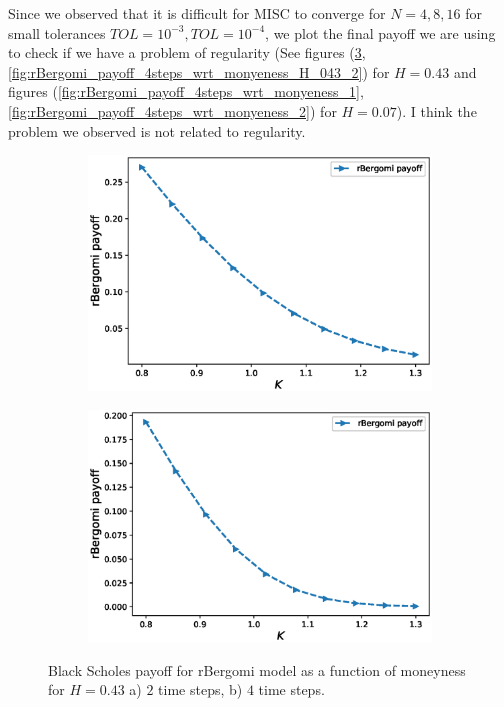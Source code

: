 \documentclass[11pt]{article}
\begin{document}
Since we observed that it is difficult for MISC to converge for $N=4,8,16$ for small tolerances $TOL=10^{-3}, TOL=10^{-4}$, we plot the final payoff we are using to check if we have a problem of regularity (See figures (\ref{fig:rBergomi_payoff_4steps_wrt_monyeness_H_043_1}, \ref{fig:rBergomi_payoff_4steps_wrt_monyeness_H_043_2}) for $H=0.43$ and figures (\ref{fig:rBergomi_payoff_4steps_wrt_monyeness_1}, \ref{fig:rBergomi_payoff_4steps_wrt_monyeness_2}) for $H=0.07$). I think the problem we observed is not related to regularity.
\begin{figure}[!h]
	\centering
	\begin{subfigure}{.5\textwidth}
		\centering
		\includegraphics[width=0.95\linewidth]{./figures/payoff_plots_H_043/rBergomi_payoff_2steps_wrt_monyeness_2_H043}
		\caption{}
		\label{fig:rBergomi_payoff_4steps_wrt_monyeness_043_sub1}
	\end{subfigure}%
	\begin{subfigure}{.5\textwidth}
		\centering
		\includegraphics[width=0.95\linewidth]{./figures/payoff_plots_H_043/rBergomi_payoff_4steps_wrt_monyeness_2_H043}
		\caption{ }
		\label{fig:rBergomi_payoff_4steps_wrt_monyeness_043_sub2}
	\end{subfigure}%
	\caption{Black Scholes payoff for rBergomi model as a function of moneyness for $H=0.43$ a) $2$  time steps, b) $4$  time steps.}
	\label{fig:rBergomi_payoff_4steps_wrt_monyeness_H_043_1}
\end{figure}
\end{document}
